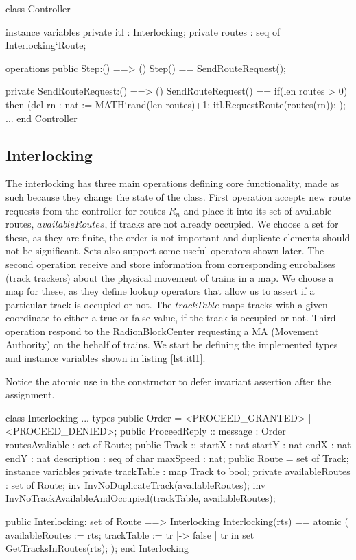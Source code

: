 \documentclass[preprint,12pt]{elsarticle}
\begin{document}
\begin{vdmsl}[label=lst:controller,caption=State variables and the SendRouteRequest() operation in the Controller.]
	class Controller
	
	instance variables
	private itl : Interlocking;
	private routes : seq of Interlocking`Route;
	
	operations
	public Step:() ==> ()
	Step() == SendRouteRequest();
	
	private SendRouteRequest:() ==> ()
	SendRouteRequest() ==
	if(len routes > 0) then
		(dcl rn : nat := MATH`rand(len routes)+1;
			itl.RequestRoute(routes(rn));
	);
	...
	end Controller
\end{vdmsl}

\subsection{Interlocking}

The interlocking has three main operations defining core functionality, made as such because they change the state of the class. First operation accepts new route requests from the controller for routes $R_{n}$ and place it into its set of available routes, $availableRoutes$, if tracks are not already occupied. We choose a set for these, as they are finite, the order is not important and duplicate elements should not be significant. Sets also support some useful operators shown later. The second operation receive and store information from corresponding eurobalises (track trackers) about the physical movement of trains in a map. We choose a map for these, as they define lookup operators that allow us to assert if a particular track is occupied or not. The $trackTable$ maps tracks with a given coordinate to either a true or false value, if the track is occupied or not. Third operation respond to the RadionBlockCenter requesting a MA (Movement Authority) on the behalf of trains. We start be defining the implemented types and instance variables shown in listing \ref{lst:itl1}.

Notice the atomic use in the constructor to defer invariant assertion after the assignment.

\begin{vdmsl}[label=lst:itl1,caption=Types and state information and constructor for the Interlocking class.]
	class Interlocking
	...
	types
	public Order = <PROCEED_GRANTED> | <PROCEED_DENIED>;
	public ProceedReply :: message : Order
	routesAvaliable : set of Route;						 
	public Track :: startX : nat
					startY : nat
					endX : nat
					endY : nat
					description : seq of char
					maxSpeed : nat;
	public Route = set of Track;
	instance variables
	private trackTable : map Track to bool;
	private availableRoutes : set of Route;
	inv InvNoDuplicateTrack(availableRoutes);
	inv InvNoTrackAvailableAndOccupied(trackTable,
	 availableRoutes);
	
	public Interlocking: set of Route ==> Interlocking
	Interlocking(rts) ==
	atomic (
		availableRoutes := rts;
		trackTable := { tr |-> false |
			 tr in set GetTracksInRoutes(rts)};
	);
	end Interlocking
\end{vdmsl}
\end{document}
